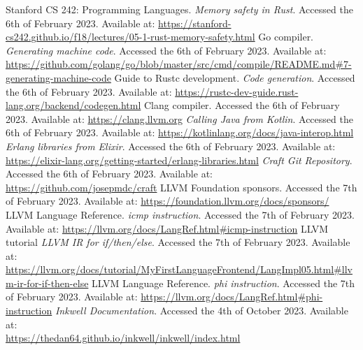 ﻿\documentclass[10pt,a4paper,twocolumn,twoside]{article}
\begin{document}
\renewcommand\refname{References}
\begin{thebibliography}{11}
 Stanford CS 242: Programming Languages. \textit{Memory safety in Rust}. Accessed the 6th of February 2023. Available at: \url{https://stanford-cs242.github.io/f18/lectures/05-1-rust-memory-safety.html}
Go compiler. \textit{Generating machine code}. Accessed the 6th of February 2023. Available at: \url{https://github.com/golang/go/blob/master/src/cmd/compile/README.md#7-generating-machine-code}
 Guide to Rustc development. \textit{Code generation}. Accessed the 6th of February 2023. Available at: \url{https://rustc-dev-guide.rust-lang.org/backend/codegen.html}
 Clang compiler. Accessed the 6th of February 2023. Available at: \url{https://clang.llvm.org}
 \textit{Calling Java from Kotlin}. Accessed the 6th of February 2023. Available at: \url{https://kotlinlang.org/docs/java-interop.html}
 \textit{Erlang libraries from Elixir}. Accessed the 6th of February 2023. Available at: \url{https://elixir-lang.org/getting-started/erlang-libraries.html}
 \textit{Craft Git Repository}. Accessed the 6th of February 2023. Available at: \\\url{https://github.com/josepmdc/craft}
 LLVM Foundation sponsors. Accessed the 7th of February 2023. Available at: \url{https://foundation.llvm.org/docs/sponsors/}
 LLVM Language Reference. \textit{icmp instruction}. Accessed the 7th of February 2023. Available at: \url{https://llvm.org/docs/LangRef.html#icmp-instruction}
 LLVM tutorial \textit{LLVM IR for if/then/else}. Accessed the 7th of February 2023. Available at: \url{https://llvm.org/docs/tutorial/MyFirstLanguageFrontend/LangImpl05.html#llvm-ir-for-if-then-else}
 LLVM Language Reference. \textit{phi instruction}. Accessed the 7th of February 2023. Available at: \url{https://llvm.org/docs/LangRef.html#phi-instruction}
 \textit{Inkwell Documentation}. Accessed the 4th of October 2023. Available at: \\\url{https://thedan64.github.io/inkwell/inkwell/index.html}
\end{thebibliography}
\end{document}
